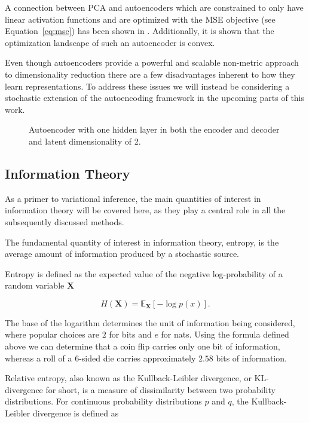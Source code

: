 A connection between PCA and autoencoders which are constrained to only have linear activation functions and are optimized with the MSE objective (see Equation~\ref{eq:mse}) has been shown in \cite{autoencoder_pca}. Additionally, it is shown that the optimization landscape of such an autoencoder is convex.

Even though autoencoders provide a powerful and scalable non-metric approach to dimensionality reduction there are a few disadvantages inherent to how they learn representations.  To address these issues we will instead be considering a stochastic extension of the autoencoding framework in the upcoming parts of this work.

\begin{figure}[!htb]
  \centering
  \resizebox{0.8\textwidth}{!}{\unskip}
  \caption{Autoencoder with one hidden layer in both the encoder and decoder and latent dimensionality of 2.}
  \label{fig:ae}
\end{figure}

\subsection{Information Theory}

As a primer to variational inference, the main quantities of interest in information theory will be covered here, as they play a central role in all the subsequently discussed methods.

The fundamental quantity of interest in information theory, entropy, is the average amount of information produced by a stochastic source. 

Entropy is defined as the expected value of the negative log-probability of a random variable $\mathbf{X}$

$$H(\mathbf{X}) = \mathbb{E}_{\mathbf{X}}[-\log p(x)].$$

The base of the logarithm determines the unit of information being considered, where popular choices are $2$ for bits and $e$ for nats. Using the formula defined above we can determine that a coin flip carries only one bit of information, whereas a roll of a 6-sided die carries approximately $2.58$ bits of information.

Relative entropy, also known as the Kullback-Leibler divergence, or KL-divergence for short, is a measure of dissimilarity between two probability distributions. For continuous probability distributions $p$ and $q$, the Kullback-Leibler divergence is defined as

